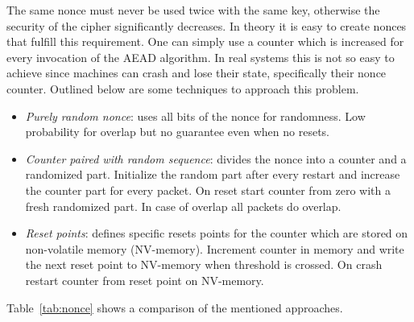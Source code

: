 The same nonce must never be used twice with the same key, otherwise the security of the
cipher significantly decreases. In theory it is easy to create nonces that fulfill this
requirement. One can simply use a counter which is increased for every invocation of the
AEAD algorithm. In real systems this is not so easy to achieve since machines can crash
and lose their state, specifically their nonce counter. Outlined below are some techniques
to approach this problem.

\begin{itemize}
	\item \textit{Purely random nonce}: uses all bits of the nonce for randomness. Low
	      probability for overlap but no guarantee even when no resets.
	\item \textit{Counter paired with random sequence}: divides the nonce into a counter
	      and a randomized part. Initialize the random part after every restart and increase
	      the counter part for every packet. On reset start counter from zero with a fresh
	      randomized part. In case of overlap all packets do overlap.
	\item \textit{Reset points}: defines specific resets points for the counter which are
	      stored on non-volatile memory (NV-memory). Increment counter in memory and write the
	      next reset point to NV-memory when threshold is crossed. On crash restart counter from
	      reset point on NV-memory.
\end{itemize}

Table~\ref{tab:nonce} shows a comparison of the mentioned approaches.



